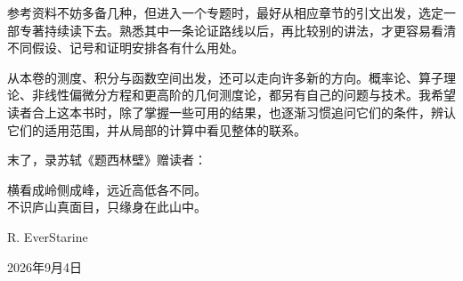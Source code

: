\ProseParagraphBreak

参考资料不妨多备几种，但进入一个专题时，最好从相应章节的引文出发，选定一部专著持续读下去。熟悉其中一条论证路线以后，再比较别的讲法，才更容易看清不同假设、记号和证明安排各有什么用处。

\ProseParagraphBreak

从本卷的测度、积分与函数空间出发，还可以走向许多新的方向。概率论、算子理论、非线性偏微分方程和更高阶的几何测度论，都另有自己的问题与技术。我希望读者合上这本书时，除了掌握一些可用的结果，也逐渐习惯追问它们的条件，辨认它们的适用范围，并从局部的计算中看见整体的联系。

\ProseParagraphBreak

末了，录苏轼《题西林壁》赠读者：

\begin{poemquote}
横看成岭侧成峰，远近高低各不同。\\
不识庐山真面目，只缘身在此山中。
\end{poemquote}

\bigskip

\begin{flushright}
	R. EverStarine
	
	2026年9月4日
\end{flushright}

